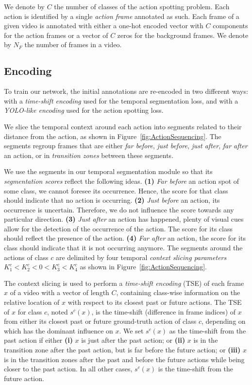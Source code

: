 \documentclass[10pt,twocolumn,letterpaper]{article}
\begin{document}
We denote by $C$ the number of classes of the action spotting problem. Each action is identified by a single \emph{action frame} annotated as such. Each frame of a given video is annotated with either a one-hot encoded vector with $C$ components for the action frames or a vector of $C$ zeros for the background frames. We denote by $N_F$ the number of frames in a video. 



\subsection{Encoding}
To train our network, the initial annotations are re-encoded in two different ways: with a \emph{time-shift encoding} used for the temporal segmentation loss, and with a \emph{YOLO-like encoding} used for the action spotting loss.


We slice the temporal context around each action into segments related to their distance from the action, as shown in Figure~\ref{fig:ActionSequencing}. The segments regroup frames that are either \emph{far before}, \emph{just before}, \emph{just after}, \emph{far after} an action, or in \emph{transition zones} between these segments. 


We use the segments in our temporal segmentation module so that its \emph{segmentation scores} reflect the following ideas. \textbf{(1)} \emph{Far before} an action spot of some class, we cannot foresee its occurrence. Hence, the score for that class should indicate that no action is occurring. \textbf{(2)} \emph{Just before} an action, its occurrence is uncertain. Therefore, we do not influence the score towards any particular direction. \textbf{(3)} \emph{Just after} an action has happened, plenty of visual cues allow for the detection of the occurrence of the action. The score for its class should reflect the presence of the action. \textbf{(4)} \emph{Far after} an action, the score for its class should indicate that it is not occurring anymore. The segments around the actions of class $c$ are delimited by four temporal \emph{context slicing parameters} $K^c_1 < K^c_2 < 0 < K^c_3 < K^c_4$ as shown in Figure~\ref{fig:ActionSequencing}. 


The context slicing is used to perform a \emph{time-shift encoding} (TSE) of each frame $x$ of a video with a vector of length $C$, containing class-wise information on the relative location of $x$ with respect to its closest past or future actions. The TSE of $x$ for class $c$, noted $s^c(x)$, is the time-shift (\ie difference in frame indices) of $x$ from either its closest past or future ground-truth action of class $c$, depending on which has the dominant influence on $x$. We set $s^c(x)$ as the time-shift from the past action if either \textbf{(i)} $x$ is just after the past action; or \textbf{(ii)} $x$ is in the transition zone after the past action, but is far before the future action; or \textbf{(iii)} $x$ is in the transition zones after the past and before the future actions while being closer to the past action. In all other cases, $s^c(x)$ is the time-shift from the future action. 
\end{document}
